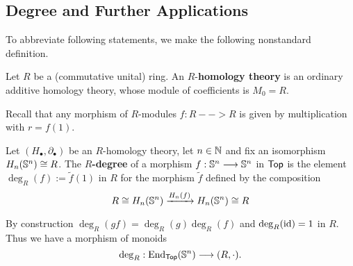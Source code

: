 	\begin{lemma}
	\end{lemma}

	\newpage
	\subsection{Degree and Further Applications}

	To abbreviate following statements, we make the following nonstandard definition.

	\begin{definition}
		Let $R$ be a (commutative unital) ring. An $R$-\textbf{homology theory} is an ordinary additive homology theory, whose module of coefficients is $M_0 = R$.
	\end{definition}

	Recall that any morphism of $R$-modules $f:R --> R$ is given by multiplication with $r = f(1)$.

	\begin{definition}
		Let $(H_\bullet,\partial_\bullet)$ be an $R$-homology theory, let $n \in \N$ and fix an isomorphism $H_n(\S^n) \isom R$. The \textbf{$R$-degree} of a morphism $f:\S^n --> \S^n$ in $\ncat{Top}$ is the element $\deg_R(f) := \tilde{f}(1)$ in $R$ for the morphism $\tilde f$ defined by the composition
		\begin{equation*}
			R \isom H_n(\S^n) \xrightarrow{H_n(f)} {H}_n(\S^n)\isom R
		\end{equation*}

		By construction $\deg_R(gf) = \deg_R(g)\deg_R(f)$ and $\deg_R(\id) = 1$ in $R$. Thus we have a morphism of monoids
		\begin{equation*}
			\deg_R: \End_\ncat{Top}(\S^n) \longrightarrow (R,\cdot).
		\end{equation*}
	\end{definition}

